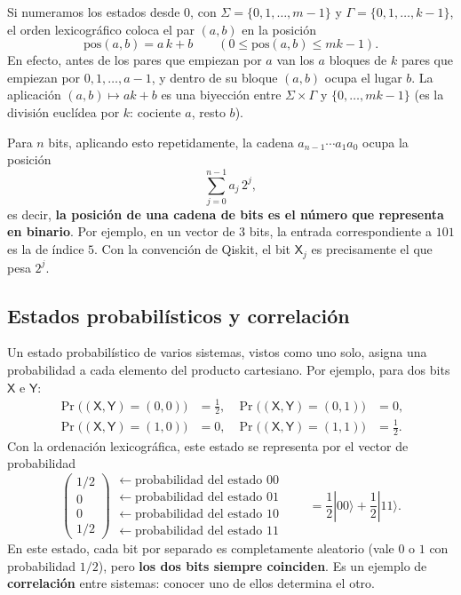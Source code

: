 \documentclass[11pt, a4paper, twoside, openright]{report}
\begin{document}
\begin{tcolorbox}[colback=teal!5!white,colframe=teal!75!black,title=\textbf{Nota Teórica: Qué posición ocupa cada estado}]
Si numeramos los estados desde $0$, con $\Sigma = \{0, 1, \dots, m-1\}$ y $\Gamma = \{0, 1, \dots, k-1\}$, el orden lexicográfico coloca el par $(a, b)$ en la posición
\[ \mathrm{pos}(a, b) = a\,k + b \qquad (0 \le \mathrm{pos}(a,b) \le mk - 1). \]
En efecto, antes de los pares que empiezan por $a$ van los $a$ bloques de $k$ pares que empiezan por $0, 1, \dots, a-1$, y dentro de su bloque $(a,b)$ ocupa el lugar $b$. La aplicación $(a,b) \mapsto ak + b$ es una biyección entre $\Sigma \times \Gamma$ y $\{0, \dots, mk-1\}$ (es la división euclídea por $k$: cociente $a$, resto $b$).

Para $n$ bits, aplicando esto repetidamente, la cadena $a_{n-1}\cdots a_1 a_0$ ocupa la posición
\[ \sum_{j=0}^{n-1} a_j\, 2^j, \]
es decir, \textbf{la posición de una cadena de bits es el número que representa en binario}. Por ejemplo, en un vector de $3$ bits, la entrada correspondiente a $101$ es la de índice $5$. Con la convención de Qiskit, el bit $\mathsf{X}_j$ es precisamente el que pesa $2^j$.
\end{tcolorbox}

\subsection{Estados probabilísticos y correlación}

\noindent Un estado probabilístico de varios sistemas, vistos como uno solo, asigna una probabilidad a cada elemento del producto cartesiano. Por ejemplo, para dos bits $\mathsf{X}$ e $\mathsf{Y}$:
\begin{align*}
\Pr\big((\mathsf{X},\mathsf{Y}) = (0,0)\big) &= \tfrac12, &
\Pr\big((\mathsf{X},\mathsf{Y}) = (0,1)\big) &= 0, \\
\Pr\big((\mathsf{X},\mathsf{Y}) = (1,0)\big) &= 0, &
\Pr\big((\mathsf{X},\mathsf{Y}) = (1,1)\big) &= \tfrac12.
\end{align*}
Con la ordenación lexicográfica, este estado se representa por el vector de probabilidad
\begin{equation}\label{eq:correlado}
\begin{pmatrix} 1/2 \\ 0 \\ 0 \\ 1/2 \end{pmatrix}
\begin{array}{l} \leftarrow \text{probabilidad del estado } 00 \\ \leftarrow \text{probabilidad del estado } 01 \\ \leftarrow \text{probabilidad del estado } 10 \\ \leftarrow \text{probabilidad del estado } 11 \end{array}
\qquad = \frac12|00\rangle + \frac12|11\rangle.
\end{equation}
En este estado, cada bit por separado es completamente aleatorio (vale $0$ o $1$ con probabilidad $1/2$), pero \textbf{los dos bits siempre coinciden}. Es un ejemplo de \textbf{correlación} entre sistemas: conocer uno de ellos determina el otro.
\end{document}
